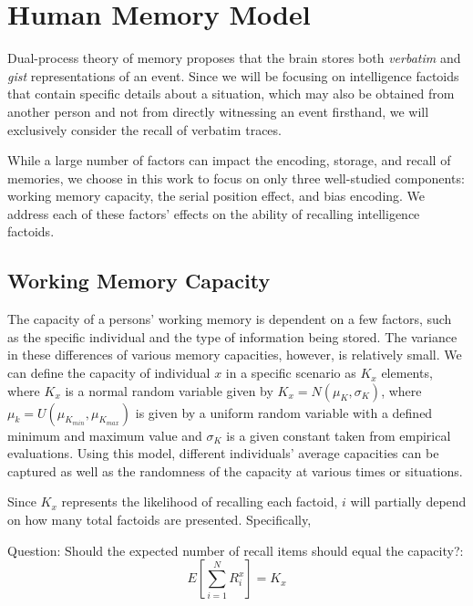\section{Human Memory Model}
\label{sec:memory_model}

Dual-process theory of memory proposes that the brain stores both \emph{verbatim} and \emph{gist} representations of an event.  Since we will be focusing on intelligence factoids that contain specific details about a situation, which may also be obtained from another person and not from directly witnessing an event firsthand, we will exclusively consider the recall of verbatim traces.  

While a large number of factors can impact the encoding, storage, and recall of memories, we choose in this work to focus on only three well-studied components:  working memory capacity, the serial position effect, and bias encoding.  We address each of these factors' effects on the ability of recalling intelligence factoids.

\subsection{Working Memory Capacity}

The capacity of a persons' working memory is dependent on a few factors, such as the specific individual and the type of information being stored.  The variance in these differences of various memory capacities, however, is relatively small.  We can define the capacity of individual $x$ in a specific scenario as $K_x$ elements, where $K_x$ is a normal random variable given by $K_x = N( \mu_K, \sigma_K )$, where $\mu_k = U(\mu_{K_{min}},\mu_{K_{max}})$ is given by a uniform random variable with a defined minimum and maximum value and $\sigma_K$ is a given constant taken from empirical evaluations.  Using this model, different individuals' average capacities can be captured as well as the randomness of the capacity at various times or situations.

Since $K_x$ represents the likelihood of recalling each factoid, $i$ will partially depend on how many total factoids are presented.  Specifically, 

Question: Should the expected number of recall items should equal the capacity?:
\begin{equation}
	E [ \sum\limits_{i=1}^N R_{i}^x ] = K_x
\end{equation}

